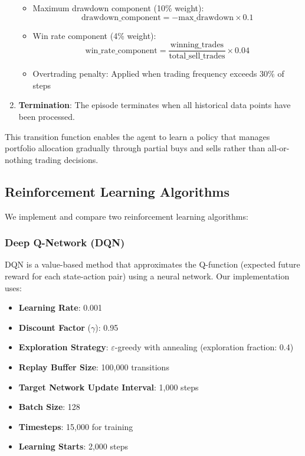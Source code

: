 \documentclass[11pt]{article}
\begin{document}
\begin{enumerate}
\begin{itemize}
    \item Maximum drawdown component (10\% weight): \[ \text{drawdown\_component} = -\text{max\_drawdown} \times 0.1 \]
    
    \item Win rate component (4\% weight): \[ \text{win\_rate\_component} = \frac{\text{winning\_trades}}{\text{total\_sell\_trades}} \times 0.04 \]
    
    \item Overtrading penalty: Applied when trading frequency exceeds 30\% of steps
  \end{itemize}
  
  \item \textbf{Termination}: The episode terminates when all historical data points have been processed.
\end{enumerate}

This transition function enables the agent to learn a policy that manages portfolio allocation gradually through partial buys and sells rather than all-or-nothing trading decisions.

\subsection{Reinforcement Learning Algorithms}
We implement and compare two reinforcement learning algorithms:

\subsubsection{Deep Q-Network (DQN)}
DQN is a value-based method that approximates the Q-function (expected future reward for each state-action pair) using a neural network. Our implementation uses:

\begin{itemize}
  \item \textbf{Learning Rate}: 0.001
  \item \textbf{Discount Factor} (\(\gamma\)): 0.95
  \item \textbf{Exploration Strategy}: \(\varepsilon\)-greedy with annealing (exploration fraction: 0.4)
  \item \textbf{Replay Buffer Size}: 100,000 transitions
  \item \textbf{Target Network Update Interval}: 1,000 steps
  \item \textbf{Batch Size}: 128
  \item \textbf{Timesteps}: 15,000 for training
  \item \textbf{Learning Starts}: 2,000 steps
\end{itemize}
\end{document}
